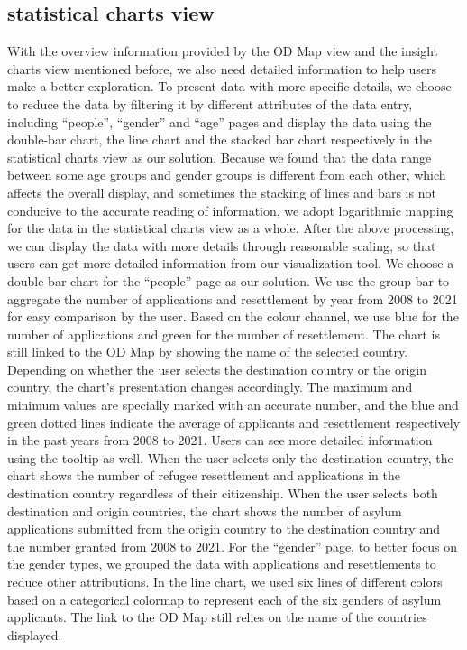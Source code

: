 \documentclass[journal]{vgtc}                %
\begin{document}
 \subsection{statistical charts view}
 With the overview information provided by the OD Map view and the insight charts view mentioned before, we also need detailed information to help users make a better exploration. To present data with more specific details, we choose to reduce the data by filtering it by different attributes of the data entry, including “people”, “gender” and “age” pages and display the data using the double-bar chart, the line chart and the stacked bar chart respectively in the statistical charts view as our solution.
 Because we found that the data range between some age groups and gender groups is different from each other, which affects the overall display, and sometimes the stacking of lines and bars is not conducive to the accurate reading of information, we adopt logarithmic mapping for the data in the statistical charts view as a whole. After the above processing, we can display the data with more details through reasonable scaling, so that users can get more detailed information from our visualization tool.
 We choose a double-bar chart for the “people” page as our solution. We use the group bar to aggregate the number of applications and resettlement by year from 2008 to 2021 for easy comparison by the user. Based on the colour channel, we use blue for the number of applications and green for the number of resettlement. The chart is still linked to the OD Map by showing the name of the selected country. Depending on whether the user selects the destination country or the origin country, the chart's presentation changes accordingly. The maximum and minimum values are specially marked with an accurate number, and the blue and green dotted lines indicate the average of applicants and resettlement respectively in the past years from 2008 to 2021. Users can see more detailed information using the tooltip as well.
 When the user selects only the destination country, the chart shows the number of refugee resettlement and applications in the destination country regardless of their citizenship. When the user selects both destination and origin countries, the chart shows the number of asylum applications submitted from the origin country to the destination country and the number granted from 2008 to 2021.
 For the “gender” page, to better focus on the gender types, we grouped the data with applications and resettlements to reduce other attributions. In the line chart, we used six lines of different colors based on a categorical colormap to represent each of the six genders of asylum applicants. The link to the OD Map still relies on the name of the countries displayed.
\end{document}
